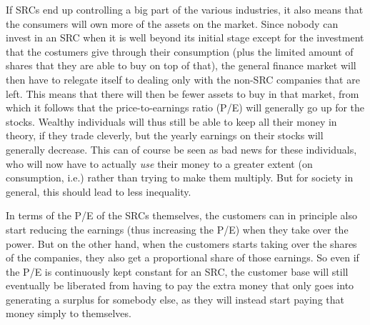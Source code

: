 \documentclass{article}
\begin{document}
If SRCs end up controlling a big part of the various industries, it also means that the consumers will own more of the assets on the market. Since nobody can invest in an SRC when it is well beyond its initial stage except for the investment that the costumers give through their consumption (plus the limited amount of shares that they are able to buy on top of that), the general finance market will then have to relegate itself to dealing only with the non-SRC companies that are left. This means that there will then be fewer assets to buy in that market, from which it follows that the price-to-earnings ratio (P/E) will generally go up for the stocks. Wealthy individuals will thus still be able to keep all their money in theory, if they trade cleverly, but the yearly earnings on their stocks will generally decrease. This can of course be seen as bad news for these individuals, who will now have to actually \emph{use} their money to a greater extent (on consumption, i.e.) rather than trying to make them multiply. 
But for society in general, this should lead to less inequality. 

In terms of the P/E of the SRCs themselves, the customers can in principle also start reducing the earnings (thus increasing the P/E) when they take over the power. But on the other hand, when the customers starts taking over the shares of the companies, they also get a proportional share of those earnings. So even if the P/E is continuously kept constant for an SRC, the customer base will still eventually be liberated from having to pay the extra money that only goes into generating a surplus for somebody else, as they will instead start paying that money simply to themselves. 
\end{document}
